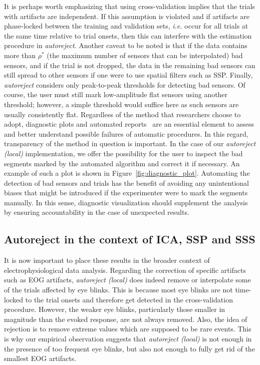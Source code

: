 It is perhaps worth emphasizing that using cross-validation implies that the trials with artifacts are independent. If this assumption is violated and if artifacts are phase-locked between the training and validation sets, \emph{i.e.} occur for all trials at the same time relative to trial onsets, then this can interfere with the estimation procedure in \emph{autoreject}. Another caveat to be noted is that if the data contains more than $\rho^{*}$ (the maximum number of sensors that can be interpolated) bad sensors, and if the trial is not dropped, the data in the remaining bad sensors can still spread to other sensors if one were to use spatial filters such as SSP. Finally, \emph{autoreject} considers only peak-to-peak thresholds for detecting bad sensors. Of course, the user must still mark low-amplitude flat sensors using another threshold; however, a simple threshold would suffice here as such sensors are usually consistently flat.
Regardless of the method that researchers choose to adopt, diagnostic plots and automated reports~\citep{dengemann2015conc} are an essential element to assess and better understand possible failures of automatic procedures. In this regard, transparency of the method in question is important. In the case of our \emph{autoreject (local)} implementation, we offer the possibility for the user to inspect the bad segments marked by the automated algorithm and correct it if necessary. An example of such a plot is shown in Figure~\ref{fig:diagnostic_plot}. Automating the detection of bad sensors and trials has the benefit of avoiding any unintentional biases that might be introduced if the experimenter were to mark the segments manually. In this sense, diagnostic visualization should supplement the analysis by ensuring accountability in the case of unexpected results.

\subsection{Autoreject in the context of ICA, SSP and SSS}

It is now important to place these results in the broader context of electrophysiological data analysis. Regarding the correction of specific artifacts such as \ac{EOG} artifacts, \emph{autoreject (local)} does indeed remove or interpolate some of the trials affected by eye blinks. This is because most eye blinks are not time-locked to the trial onsets and therefore get detected in the cross-validation procedure. However, the weaker eye blinks, particularly those smaller in magnitude than the evoked response, are not always removed. Also, the idea of rejection is to remove extreme values which are supposed to be rare events. This is why our empirical observation suggests that \emph{autoreject (local)} is not enough in the presence of too frequent eye blinks, but also not enough to fully get rid of the smallest EOG artifacts. 

